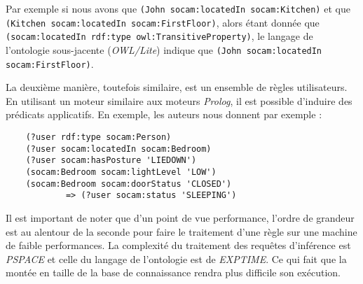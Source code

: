 Par exemple si nous avons que \verb|(John socam:locatedIn socam:Kitchen)| et que \verb|(Kitchen socam:locatedIn socam:FirstFloor)|, alors étant donnée que \verb|(socam:locatedIn rdf:type owl:TransitiveProperty)|, le langage de l'ontologie sous-jacente (\textit{OWL/Lite}) indique que \verb|(John socam:locatedIn socam:FirstFloor)|.

La deuxième manière, toutefois similaire, est un ensemble de règles utilisateurs. En utilisant un moteur similaire aux moteurs \textit{Prolog}, il est possible d'induire des prédicats applicatifs. En exemple, les auteurs nous donnent par exemple :
\begin{verbatim}
    (?user rdf:type socam:Person)
    (?user socam:locatedIn socam:Bedroom)
    (?user socam:hasPosture 'LIEDOWN')
    (socam:Bedroom socam:lightLevel 'LOW')
    (socam:Bedroom socam:doorStatus 'CLOSED')
            => (?user socam:status 'SLEEPING')
\end{verbatim}

Il est important de noter que d'un point de vue performance, l'ordre de grandeur est au alentour de la seconde pour faire le traitement d'une règle sur une machine de faible performances. La complexité du traitement des requêtes d'inférence est \textit{PSPACE} et celle du langage de l'ontologie est de \textit{EXPTIME}. Ce qui fait que la montée en taille de la base de connaissance rendra plus difficile son exécution.
